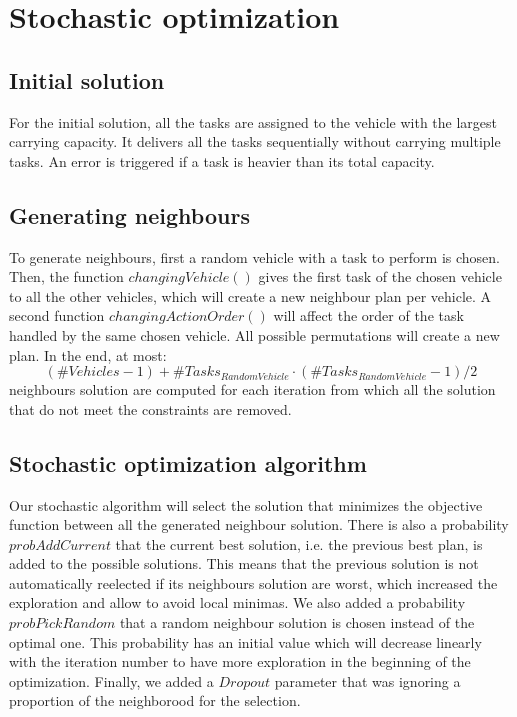 \documentclass[11pt]{article}
\begin{document}
\section{Stochastic optimization}

\subsection{Initial solution}
For the initial solution, all the tasks are assigned to the vehicle with the largest carrying capacity. It delivers all the tasks sequentially without carrying multiple tasks. An error is triggered if a task is heavier than its total capacity.

\subsection{Generating neighbours}
To generate neighbours, first a random vehicle with a task to perform is chosen. Then, the function $changingVehicle()$ gives the first task of the chosen vehicle to all the other vehicles, which will create a new neighbour plan per vehicle. A second function $changingActionOrder()$ will affect the order of the task handled by the same chosen vehicle. All possible permutations will create a new plan.
In the end, at most: 
$$ (\#Vehicles-1) + \#Tasks_{RandomVehicle} \cdot (\#Tasks_{RandomVehicle}-1)/2 $$ neighbours solution are computed for each iteration from which all the solution that do not meet the constraints are removed.


\subsection{Stochastic optimization algorithm}
Our stochastic algorithm will select the solution that minimizes the objective function between all the generated neighbour solution. There is also a probability $probAddCurrent$ that the current best solution, i.e. the previous best plan, is added to the possible solutions. This means that the previous solution is not automatically reelected if its neighbours solution are worst, which increased the exploration and allow to avoid local minimas. 
We also added a probability $probPickRandom$ that a random neighbour solution is chosen instead of the optimal one. This probability has an initial value which will decrease linearly with the iteration number to have more exploration in the beginning of the optimization.
Finally, we added a $Dropout$ parameter that was ignoring a proportion of the neighborood for the selection.
\end{document}
